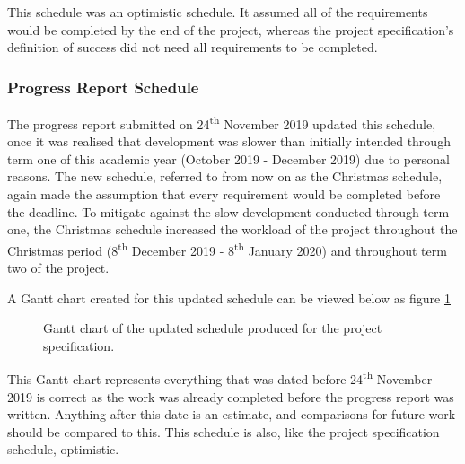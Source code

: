 \documentclass{article}
\begin{document}
This schedule was an optimistic schedule. It assumed all of the requirements would be completed by the end of the project, whereas the project specification's definition of success did not need all requirements to be completed. 

\subsubsection{Progress Report Schedule}

The progress report submitted on 24\textsuperscript{th} November 2019 updated this schedule, once it was realised that development was slower than initially intended through term one of this academic year (October 2019 - December 2019) due to personal reasons. The new schedule, referred to from now on as the Christmas schedule, again made the assumption that every requirement would be completed before the deadline. To mitigate against the slow development conducted through term one, the Christmas schedule increased the workload of the project throughout the Christmas period (8\textsuperscript{th} December 2019 - 8\textsuperscript{th} January 2020) and throughout term two of the project. \par

A Gantt chart created for this updated schedule can be viewed below as figure \ref{figure:progressReportGanttChart}

\begin{figure}[H]
	\centering
	\caption{Gantt chart of the updated schedule produced for the project specification.}
	\label{figure:progressReportGanttChart}
\end{figure}

This Gantt chart represents everything that was dated before 24\textsuperscript{th} November 2019 is correct as the work was already completed before the progress report was written. Anything after this date is an estimate, and comparisons for future work should be compared to this. This schedule is also, like the project specification schedule, optimistic. 
\end{document}
